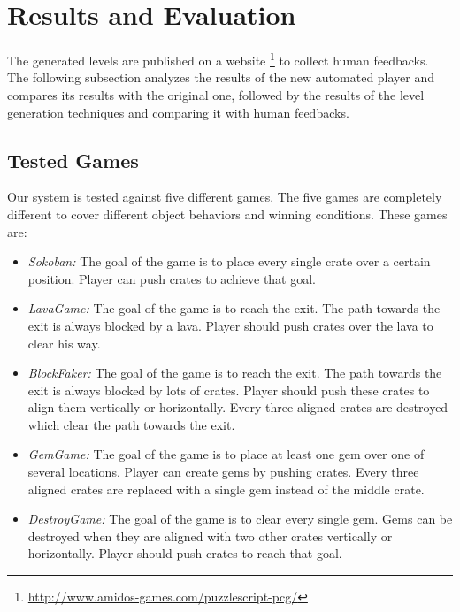 \documentclass[letterpaper]{article}
\begin{document}
\section{Results and Evaluation}
The generated levels are published on a website \footnote{\url{http://www.amidos-games.com/puzzlescript-pcg/}} to collect human feedbacks. The following subsection analyzes the results of the new automated player and compares its results with the original one, followed by the results of the level generation techniques and comparing it with human feedbacks.

\subsection{Tested Games}
Our system is tested against five different games. The five games are completely different to cover different object behaviors and winning conditions. These games are:
\begin{itemize} \itemsep0pt \parskip0pt 
	\item \emph{Sokoban:} The goal of the game is to place every single crate over a certain position. Player can push crates to achieve that goal.
	\item \emph{LavaGame:} The goal of the game is to reach the exit. The path towards the exit is always blocked by a lava. Player should push crates over the lava to clear his way.
	\item \emph{BlockFaker:} The goal of the game is to reach the exit. The path towards the exit is always blocked by lots of crates. Player should push these crates to align them vertically or horizontally. Every three aligned crates are destroyed which clear the path towards the exit.
	\item \emph{GemGame:} The goal of the game is to place at least one gem over one of several locations. Player can create gems by pushing crates. Every three aligned crates are replaced with a single gem instead of the middle crate.
	\item \emph{DestroyGame:} The goal of the game is to clear every single gem. Gems can be destroyed when they are aligned with two other crates vertically or horizontally. Player should push crates to reach that goal.
\end{itemize}
\end{document}
